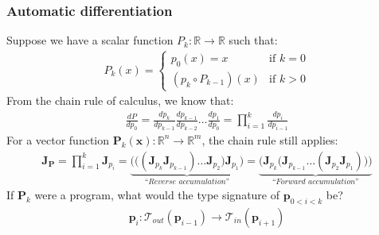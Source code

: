 \documentclass{beamer}
\begin{document}
    \begin{frame}
        \frametitle{Automatic differentiation}
        Suppose we have a scalar function $P_k: \mathbb{R}\rightarrow\mathbb{R}$ such that:
        \begin{align*}
            P_k(x) = \begin{cases} p_0(x) = x &\text{if } k=0\\ (p_k\circ P_{k-1})(x)&\text{if } k > 0 \end{cases}
        \end{align*}
        From the chain rule of calculus, we know that:
        \begin{align*}
            \frac{dP}{dp_0} = \frac{dp_k}{dp_{k-1}}\frac{dp_{k-1}}{dp_{k-2}}\dots\frac{dp_1}{dp_0}= {\displaystyle \prod_{i=1}^{k} \frac{dp_{i}}{dp_{i-1}}}
        \end{align*}
        For a vector function $\mathbf{P}_k(\mathbf{x}): \mathbb{R}^n\rightarrow\mathbb{R}^m$, the chain rule still applies:
        \begin{align*}
            \mathbf{J}_\mathbf{P} = \displaystyle \prod_{i=1}^{k} \mathbf{J}_{p_i} = \underbrace{\bigg(\Big((\mathbf{J}_{p_k} \mathbf{J}_{p_{k-1}}) \dots \mathbf{J}_{p_2}\Big) \mathbf{J}_{p_1}\bigg)}_{\textit{``Reverse accumulation''}} = \underbrace{\bigg(\mathbf{J}_{p_k} \Big(\mathbf{J}_{p_{k-1}} \dots (\mathbf{J}_{p_2} \mathbf{J}_{p_1})\Big)\bigg)}_{\textit{``Forward accumulation''}}
        \end{align*}
        If $\mathbf{P}_{k}$ were a program, what would the type signature of $\mathbf{p}_{0<i<k}$ be?
        \begin{align*}
            \mathbf{p}_i: \mathcal{T}_{out}(\mathbf{p}_{i-1}) \rightarrow \mathcal{T}_{in}(\mathbf{p}_{i+1})
        \end{align*}
    \end{frame}

\end{document}

